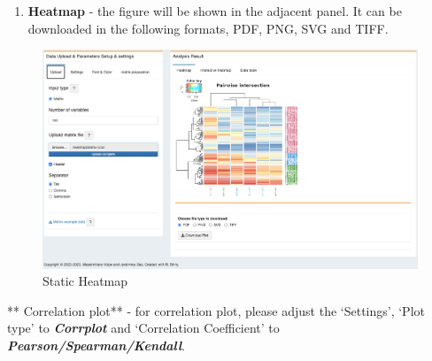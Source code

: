 \documentclass[
  a4paper,
  oneside,
  open=any]{scrreport}
\providecommand{\tightlist}{%
  \setlength{\itemsep}{0pt}\setlength{\parskip}{0pt}}\usepackage{longtable,booktabs,array}
\begin{document}
\begin{enumerate}
\def\labelenumi{\arabic{enumi}.}
\tightlist
\item
  \textbf{Heatmap} - the figure will be shown in the adjacent panel. It
  can be downloaded in the following formats, PDF, PNG, SVG and TIFF.\\
\end{enumerate}

\begin{figure}[H]

{\centering \includegraphics{./_images/heatmap.png}

}

\caption{Static Heatmap}

\end{figure}

\begin{tcolorbox}[enhanced jigsaw, left=2mm, colback=white, breakable, leftrule=.75mm, coltitle=black, toprule=.15mm, rightrule=.15mm, colbacktitle=quarto-callout-tip-color!10!white, title=\textcolor{quarto-callout-tip-color}{\faLightbulb}\hspace{0.5em}{Tip}, opacitybacktitle=0.6, colframe=quarto-callout-tip-color-frame, bottomrule=.15mm, bottomtitle=1mm, toptitle=1mm, titlerule=0mm, opacityback=0, arc=.35mm]
** Correlation plot** - for correlation plot, please adjust the
`Settings', `Plot type' to \textbf{\emph{Corrplot}} and `Correlation
Coefficient' to \textbf{\emph{Pearson/Spearman/Kendall}}.
\end{tcolorbox}
\end{document}
